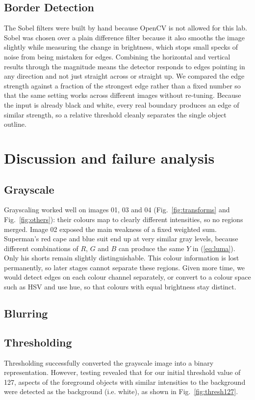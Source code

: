 \documentclass[conference]{IEEEtran}
\begin{document}
\subsection{Border Detection}
The Sobel filters were built by hand because OpenCV is not allowed for this lab. Sobel was chosen over a plain difference filter because it also smooths the image slightly while measuring the change in brightness, which stops small specks of noise from being mistaken for edges. Combining the horizontal and vertical results through the magnitude means the detector responds to edges pointing in any direction and not just straight across or straight up. We compared the edge strength against a fraction of the strongest edge rather than a fixed number so that the same setting works across different images without re-tuning. Because the input is already black and white, every real boundary produces an edge of similar strength, so a relative threshold cleanly separates the single object outline.

\section{Discussion and failure analysis}
\subsection{Grayscale}
Grayscaling worked well on images 01, 03 and 04 (Fig.~\ref{fig:transforms} and Fig.~\ref{fig:others}): their colours map to clearly different intensities, so no regions merged. Image 02 exposed the main weakness of a fixed weighted sum. Superman's red cape and blue suit end up at very similar gray levels, because different combinations of $R$, $G$ and $B$ can produce the same $Y$ in (\ref{eq:luma}). Only his shorts remain slightly distinguishable. This colour information is lost permanently, so later stages cannot separate these regions. Given more time, we would detect edges on each colour channel separately, or convert to a colour space such as HSV and use hue, so that colours with equal brightness stay distinct.
\subsection{Blurring}
\subsection{Thresholding}
Thresholding successfully converted the grayscale image into a binary representation. However, testing revealed that for our initial threshold value of 127, aspects of the foreground objects with similar intensities to the background were detected as the background (i.e. white), as shown in Fig.~\ref{fig:thresh127}.
\end{document}

